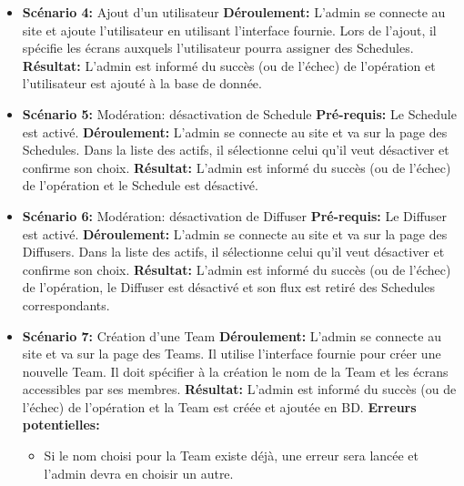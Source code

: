 \documentclass[french]{article}
\begin{document}
\begin{itemize}
		\item \textbf{Scénario 4:} Ajout d'un utilisateur\newline
		\textbf{Déroulement:} L'admin se connecte au site et ajoute l'utilisateur en utilisant l'interface fournie. Lors de l'ajout, il spécifie les écrans auxquels l'utilisateur pourra assigner des Schedules.\newline
		\textbf{Résultat:} L'admin est informé du succès (ou de l'échec) de l'opération et l'utilisateur est ajouté à la base de donnée.\newline

		\item \textbf{Scénario 5:} Modération: désactivation de Schedule\newline
		\textbf{Pré-requis:} Le Schedule est activé.\newline
		\textbf{Déroulement:} L'admin se connecte au site et va sur la page des Schedules. Dans la liste des actifs, il sélectionne celui qu'il veut désactiver et confirme son choix.\newline
		\textbf{Résultat:} L'admin est informé du succès (ou de l'échec) de l'opération et le Schedule est désactivé.\newline
		
		\item \textbf{Scénario 6:} Modération: désactivation de Diffuser\newline
		\textbf{Pré-requis:} Le Diffuser est activé.\newline
		\textbf{Déroulement:} L'admin se connecte au site et va sur la page des Diffusers. Dans la liste des actifs, il sélectionne celui qu'il veut désactiver et confirme son choix.\newline
		\textbf{Résultat:} L'admin est informé du succès (ou de l'échec) de l'opération, le Diffuser est désactivé et son flux est retiré des Schedules correspondants.\newline
		
		\item \textbf{Scénario 7:} Création d'une Team\newline
		\textbf{Déroulement:} L'admin se connecte au site et va sur la page des Teams. Il utilise l'interface fournie pour créer une nouvelle Team. Il doit spécifier à la création le nom de la Team et les écrans accessibles par ses membres. \newline
		\textbf{Résultat:} L'admin est informé du succès (ou de l'échec) de l'opération et la Team est créée et ajoutée en BD.\newline
		\textbf{Erreurs potentielles:} 
			\begin{itemize}
				\item Si le nom choisi pour la Team existe déjà, une erreur sera lancée et l'admin devra en choisir un autre. 
			\end{itemize}
			

\end{itemize}
\end{document}
